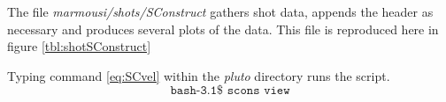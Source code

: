 The file \emph{marmousi/shots/SConstruct} gathers shot data, appends the header as necessary and produces several plots of the data.  This file is reproduced here in figure \ref{tbl:shotSConstruct}


{
\tiny

\normalsize
}


Typing command \ref{eq:SCvel} within the \emph{pluto} directory runs the script.
\begin{equation}\label{eq:SCvel} \texttt{bash-3.1\$\ scons\ view} \end{equation}

